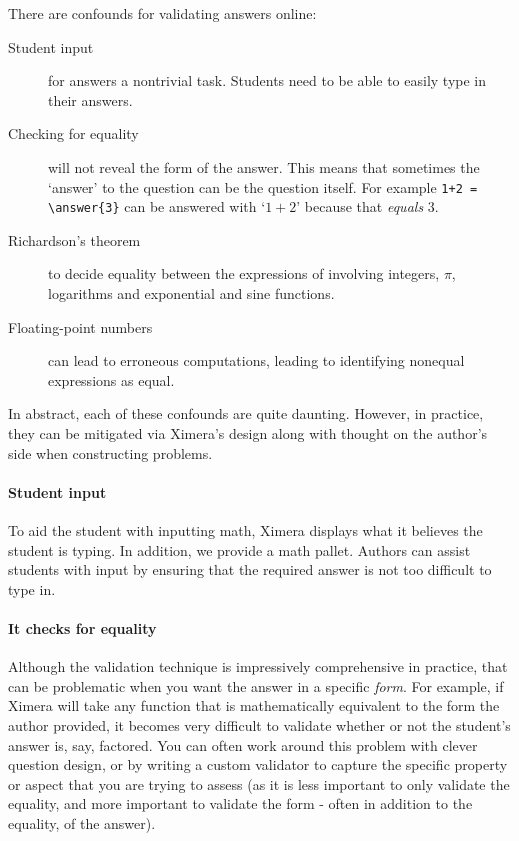 \documentclass{ximera}
\begin{document}
There are confounds for validating answers online:
\begin{description}
  \item[Student input] for answers a nontrivial task. Students need to be able
    to easily type in their answers.
  \item[Checking for equality] will not reveal the form of the answer. This
    means that sometimes the `answer' to the question can be the question
    itself. For example  \verb!1+2 = \answer{3}! can be answered with `$1+2$'
    because
    that \textit{equals} $3$.
    \item[Richardson's theorem ]
    to decide equality between the expressions of involving integers, $\pi$,
    logarithms and exponential and sine functions.
  \item[Floating-point numbers] can lead to erroneous computations, leading to
    identifying nonequal expressions as equal.
\end{description}
In abstract, each of these confounds are quite daunting. However, in practice,
they can be mitigated via Ximera's design along with thought on the author's
side when constructing problems.

\paragraph{Student input} To aid the student with inputting math, Ximera
displays what it believes the student is typing. In addition, we provide a math
pallet. Authors can assist students with input by ensuring that the required
answer is not too difficult to type in.

\paragraph{It checks for equality}
Although the validation technique is impressively comprehensive in
practice, that can be problematic when you want the answer in a specific
\textit{form}. For example, if Ximera will take any function that is
mathematically equivalent to the form the author provided, it becomes very
difficult to validate whether or not the student's answer is, say, factored.
You can often work around this problem with clever question design, or by
writing a custom validator to capture the specific property or aspect that you
are trying to assess (as it is less important to only validate the equality,
and more important to validate the form - often in addition to the equality, of
the answer).
\end{document}
